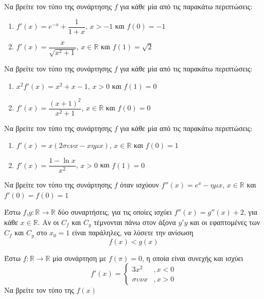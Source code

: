 \documentclass{presentation}
\begin{document}
\begin{askisi}
  Να βρείτε τον τύπο της συνάρτησης $f$ για κάθε μία από τις παρακάτω περιπτώσεις:
  \begin{enumerate}[<+->]
    \item $f'(x)=e^{-x}+\dfrac{1}{1+x}$, $x>-1$ και $f(0)=-1$
    \item $f'(x)=\dfrac{x}{\sqrt{x^2+1}}$, $x\in\mathbb{R}$ και $f(1)=\sqrt{2}$
  \end{enumerate}
\end{askisi}

\begin{askisi}
  Να βρείτε τον τύπο της συνάρτησης $f$ για κάθε μία από τις παρακάτω περιπτώσεις:
  \begin{enumerate}[<+->]
    \item $x^2f'(x)=x^2+x-1$, $x>0$ και $f(1)=0$
    \item $f'(x)=\dfrac{(x+1)^2}{x^2+1}$, $x\in\mathbb{R}$ και $f(0)=0$
  \end{enumerate}
\end{askisi}

\begin{askisi}
  Να βρείτε τον τύπο της συνάρτησης $f$ για κάθε μία από τις παρακάτω περιπτώσεις:
  \begin{enumerate}[<+->]
    \item $f'(x)=x(2συνx-xημx)$, $x\in\mathbb{R}$ και $f(0)=1$
    \item $f'(x)=\dfrac{1-\ln x}{x^2}$, $x>0$ και $f(1)=0$
  \end{enumerate}
\end{askisi}

\begin{askisi}
  Να βρείτε τον τύπο της συνάρτησης $f$ όταν ισχύουν $f''(x)=e^x-ημx$, $x\in\mathbb{R}$ και $f'(0)=f(0)=1$
\end{askisi}

\begin{askisi}
  Έστω $f$,$g:\mathbb{R}\to\mathbb{R}$ δύο συναρτήσεις, για τις οποίες ισχύει $f''(x)=g''(x)+2$, για κάθε $x\in\mathbb{R}$. Αν οι $C_f$ και $C_g$ τέμνονται πάνω στον άξονα $y'y$ και οι εφαπτομένες των $C_f$ και $C_g$ στο $x_0=1$ είναι παράληλες, να λύσετε την ανίσωση
  $$f(x)<g(x)$$
\end{askisi}

\begin{askisi}
  Έστω $f:\mathbb{R}\to\mathbb{R}$ μία συνάρτηση με $f(π)=0$, η οποία είναι συνεχής και ισχύει
  $$f'(x)=\begin{cases}
      3x^2 & ,x<0 \\
      συνx & ,x>0
    \end{cases}$$
  Να βρείτε τον τύπο της $f(x)$
\end{askisi}
\end{document}
